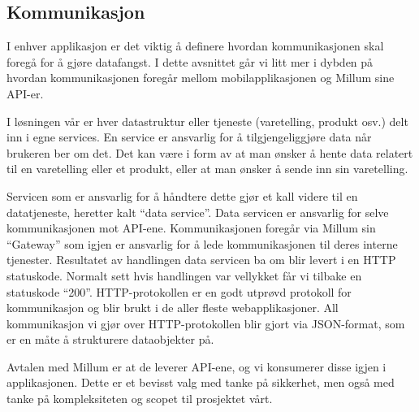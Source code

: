 \subsection{\textbf{Kommunikasjon}} \label{kommunikasjon}
I enhver applikasjon er det viktig å definere hvordan kommunikasjonen skal foregå for å gjøre datafangst. I dette avsnittet går vi litt mer i dybden på hvordan kommunikasjonen foregår mellom mobilapplikasjonen og Millum sine API-er.

I løsningen vår er hver datastruktur eller tjeneste (varetelling, produkt osv.) delt inn i egne services. En service er ansvarlig for å tilgjengeliggjøre data når brukeren ber om det. Det kan være i form av at man ønsker å hente data relatert til en varetelling eller et produkt, eller at man ønsker å sende inn sin varetelling.

Servicen som er ansvarlig for å håndtere dette gjør et kall videre til en datatjeneste, heretter kalt “data service”. Data servicen er ansvarlig for selve kommunikasjonen mot API-ene. Kommunikasjonen foregår via Millum sin “Gateway” som igjen er ansvarlig for å lede kommunikasjonen til deres interne tjenester. Resultatet av handlingen data servicen ba om blir levert i en HTTP statuskode. Normalt sett hvis handlingen var vellykket får vi tilbake en statuskode “200”. HTTP-protokollen er en godt utprøvd protokoll for kommunikasjon og blir brukt i de aller fleste webapplikasjoner. All kommunikasjon vi gjør over HTTP-protokollen blir gjort via JSON-format, som er en måte å strukturere dataobjekter på.

Avtalen med Millum er at de leverer API-ene, og vi konsumerer disse igjen i applikasjonen. Dette er et bevisst valg med tanke på sikkerhet, men også med tanke på kompleksiteten og scopet til prosjektet vårt. 

